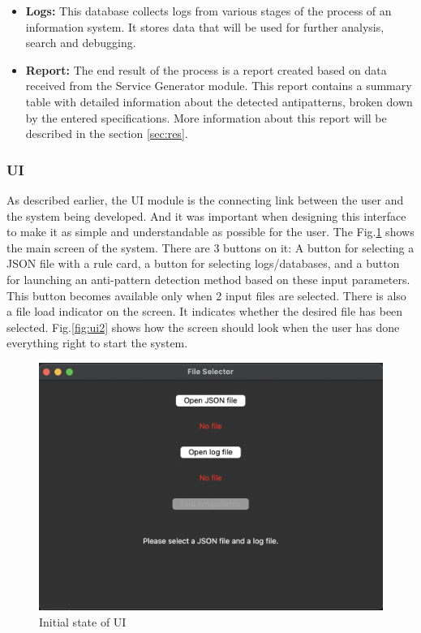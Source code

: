 \documentclass[12pt, times]{article}
\begin{document}
\begin{itemize}
	 	\item \textbf{Logs:} This database collects logs from various stages of the process of an information system. It stores data that will be used for further analysis, search and debugging.
	 	\item \textbf{Report:} The end result of the process is a report created based on data received from the Service Generator module. This report contains a summary table with detailed information about the detected antipatterns, broken down by the entered specifications. More information about this report will be described in the section \ref{sec:res}.
	 \end{itemize}
	 
	 \subsubsection{UI}
	 
	  \hspace*{5mm} As described earlier, the UI module is the connecting link between the user and the system being developed. And it was important when designing this interface to make it as simple and understandable as possible for the user. The Fig.\ref{fig:ui1} shows the main screen of the system. There are 3 buttons on it: A button for selecting a JSON file with a rule card, a button for selecting logs/databases, and a button for launching an anti-pattern detection method based on these input parameters. This button becomes available only when 2 input files are selected. There is also a file load indicator on the screen. It indicates whether the desired file has been selected. Fig.\ref{fig:ui2} shows how the screen should look when the user has done everything right to start the system.
	  
	  \begin{figure}[h]
	  	\centering
	  	\includegraphics[scale=0.6]{ui1}
	  	\caption{Initial state of UI}
	  	\label{fig:ui1}
	  \end{figure}
	  
\end{document}
